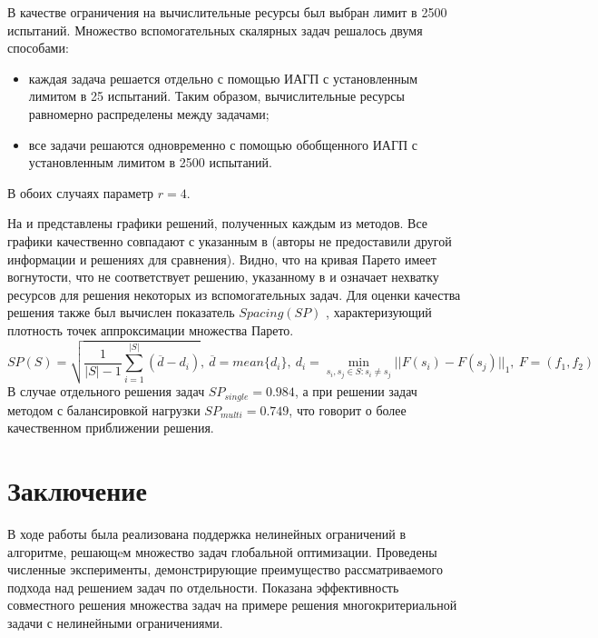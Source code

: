 \documentclass{cmi}
\begin{document}
В качестве ограничения на вычислительные ресурсы был выбран лимит в 2500 испытаний.
Множество вспомогательных скалярных задач решалось двумя способами:
\begin{itemize}
  \item каждая задача решается отдельно с помощью ИАГП с установленным лимитом в
  25 испытаний. Таким образом, вычислительные ресурсы равномерно распределены между задачами;
  \item все задачи решаются одновременно с помощью обобщенного ИАГП с установленным лимитом в
  2500 испытаний.
\end{itemize}
В обоих случаях параметр \(r=4\).


На  и 
представлены графики решений, полученных каждым из методов.
Все графики качественно совпадают с указанным в \cite{BinhKorn1999} (авторы не предоставили другой
информации и решениях для сравнения). Видно, что на 
кривая Парето имеет вогнутости, что не соответствует решению, указанному в \cite{BinhKorn1999} и
означает нехватку ресурсов для решения некоторых из вспомогательных задач.
Для оценки качества решения также был вычислен показатель \(Spacing(SP)\) \cite{RiquelmeLucken2015},
характеризующий плотность точек аппроксимации множества Парето.
\begin{displaymath}
  SP(S)=\sqrt{\frac{1}{|S|-1} \sum_{i=1}^{|S|} (\overline{d}-d_i)},
  \:\overline{d}=mean\{d_i\},\:d_i=\min_{s_i,s_j\in S:s_i\ne s_j}||F(s_i)-F(s_j)||_1,\: F=(f_1,f_2)
\end{displaymath}
В случае отдельного решения задач \(SP_{single}=0.984\), а при решении задач методом с балансировкой нагрузки
\(SP_{multi}=0.749\), что говорит о более качественном приближении решения.

\section*{Заключение}

В ходе работы была реализована поддержка нелинейных ограничений в алгоритме, решающeм
множество задач глобальной оптимизации. Проведены численные эксперименты, демонстрирующие
преимущество рассматриваемого подхода над решением задач по отдельности. Показана эффективность
совместного решения множества задач на примере решения многокритериальной задачи с
нелинейными ограничениями.
\end{document}

